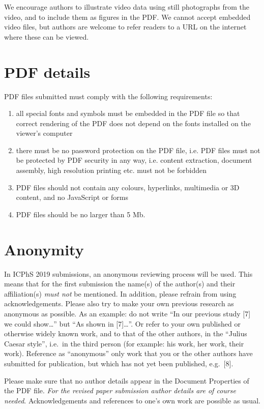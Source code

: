 \documentclass[
  a4paper,
  11pt,
  twocolumn]{article}
\begin{document}
We encourage authors to illustrate video data using still photographs
from the video, and to include them as figures in the PDF. We cannot
accept embedded video files, but authors are welcome to refer readers to
a URL on the internet where these can be viewed.

\section{PDF details}

PDF files submitted must comply with the following requirements:

\begin{enumerate}
  \item all special fonts and symbols must be embedded in the PDF file so 
  that correct rendering of the PDF does not depend on the fonts installed 
  on the viewer's computer
  \item there must be no password protection on the PDF file, i.e. PDF files 
  must not be protected by PDF security in any way, i.e. content extraction, 
  document assembly, high resolution printing etc. must not be forbidden
  \item PDF files should not contain any colours, hyperlinks, multimedia or 
  3D content, and no JavaScript or forms
  \item PDF files should be no larger than 5 Mb.
\end{enumerate}

\section{Anonymity}

In ICPhS 2019 submissions, an anonymous reviewing process will be used.
This means that for the first submission the name(s) of the author(s)
and their affiliation(s) \emph{must not} be mentioned. In addition,
please refrain from using acknowledgements. Please also try to make your
own previous research as anonymous as possible. As an example: do not
write ``In our previous study {[}7{]} we could show\ldots'' but ``As
shown in {[}7{]}\ldots''. Or refer to your own published or otherwise
widely known work, and to that of the other authors, in the ``Julius
Caesar style'', i.e.~in the third person (for example: his work, her
work, their work). Reference as ``anonymous'' only work that you or the
other authors have submitted for publication, but which has not yet been
published, e.g.~{[}8{]}.

Please make sure that no author details appear in the Document
Properties of the PDF file.
\emph{For the revised paper submission author details are of 
course needed}. Acknowledgements and references to one's own work are
possible as usual.
\end{document}

